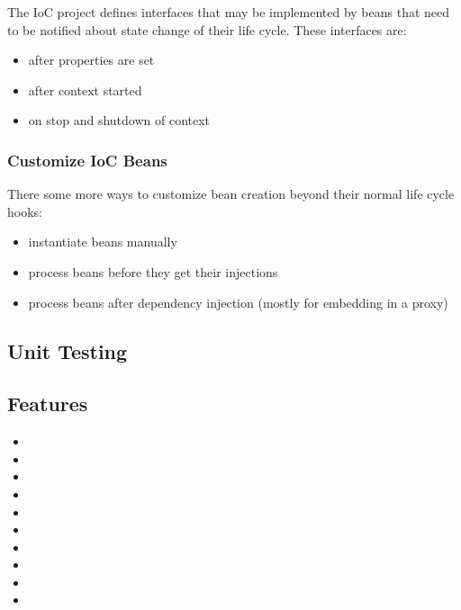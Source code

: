 \def\showimgref{img/bean-lifecycle.png}

The \AMBETH{} IoC project defines interfaces that may be implemented by beans that need to be notified about state change of their life cycle. These interfaces are:

\begin{itemize}
	\item {} after properties are set
	\item {} after context started
	\item {} on stop and shutdown of context
\end{itemize}

\subsubsection{Customize IoC Beans}

There some more ways to customize bean creation beyond their normal life cycle hooks:

\begin{itemize}
	\item {} instantiate beans manually
	\item {} process beans before they get their injections
	\item {} process beans after dependency injection (mostly for embedding in a proxy)
\end{itemize}

\subsection{Unit Testing}
\TODO

\subsection{Features}
\begin{itemize}
	\item {}
	\item {}
	\item {}
	\item {}
	\item {}
	\item {}
	\item {}
	\item {}
	\item {}
	\item {}
\end{itemize}
